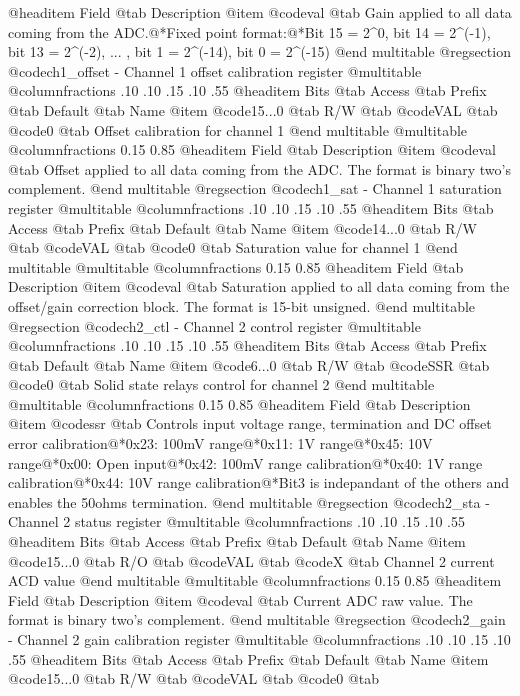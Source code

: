 @headitem Field @tab Description
@item @code{val} @tab Gain applied to all data coming from the ADC.@*Fixed point format:@*Bit 15 = 2^0, bit 14 = 2^(-1), bit 13 = 2^(-2), ... , bit 1 = 2^(-14), bit 0 = 2^(-15)
@end multitable
@regsection @code{ch1_offset} - Channel 1 offset calibration register
@multitable @columnfractions .10 .10 .15 .10 .55
@headitem Bits @tab Access @tab Prefix @tab Default @tab Name
@item @code{15...0}
@tab R/W @tab
@code{VAL}
@tab @code{0} @tab 
Offset calibration for channel 1
@end multitable
@multitable @columnfractions 0.15 0.85
@headitem Field @tab Description
@item @code{val} @tab Offset applied to all data coming from the ADC. The format is binary two's complement.
@end multitable
@regsection @code{ch1_sat} - Channel 1 saturation register
@multitable @columnfractions .10 .10 .15 .10 .55
@headitem Bits @tab Access @tab Prefix @tab Default @tab Name
@item @code{14...0}
@tab R/W @tab
@code{VAL}
@tab @code{0} @tab 
Saturation value for channel 1
@end multitable
@multitable @columnfractions 0.15 0.85
@headitem Field @tab Description
@item @code{val} @tab Saturation applied to all data coming from the offset/gain correction block. The format is 15-bit unsigned.
@end multitable
@regsection @code{ch2_ctl} - Channel 2 control register
@multitable @columnfractions .10 .10 .15 .10 .55
@headitem Bits @tab Access @tab Prefix @tab Default @tab Name
@item @code{6...0}
@tab R/W @tab
@code{SSR}
@tab @code{0} @tab 
Solid state relays control for channel 2
@end multitable
@multitable @columnfractions 0.15 0.85
@headitem Field @tab Description
@item @code{ssr} @tab Controls input voltage range, termination and DC offset error calibration@*0x23: 100mV range@*0x11: 1V range@*0x45: 10V range@*0x00: Open input@*0x42: 100mV range calibration@*0x40: 1V range calibration@*0x44: 10V range calibration@*Bit3 is indepandant of the others and enables the 50ohms termination.
@end multitable
@regsection @code{ch2_sta} - Channel 2 status register
@multitable @columnfractions .10 .10 .15 .10 .55
@headitem Bits @tab Access @tab Prefix @tab Default @tab Name
@item @code{15...0}
@tab R/O @tab
@code{VAL}
@tab @code{X} @tab 
Channel 2 current ACD value
@end multitable
@multitable @columnfractions 0.15 0.85
@headitem Field @tab Description
@item @code{val} @tab Current ADC raw value. The format is binary two's complement.
@end multitable
@regsection @code{ch2_gain} - Channel 2 gain calibration register
@multitable @columnfractions .10 .10 .15 .10 .55
@headitem Bits @tab Access @tab Prefix @tab Default @tab Name
@item @code{15...0}
@tab R/W @tab
@code{VAL}
@tab @code{0} @tab 
